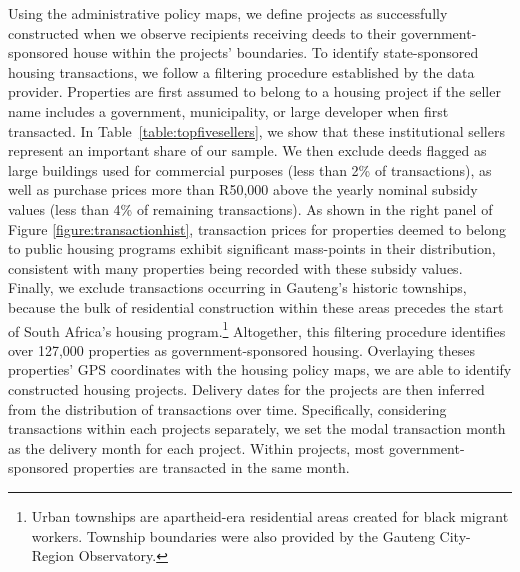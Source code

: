 \documentclass[12pt]{article}
\begin{document}
 Using the administrative policy maps, we define projects as successfully constructed when we observe recipients receiving deeds to their government-sponsored house within the projects' boundaries. To identify state-sponsored housing transactions, we follow a filtering procedure established by the data provider. Properties are first assumed to belong to a housing project if the seller name includes a government, municipality, or large developer when first transacted. In 	\mbox{Table \ref{table:topfivesellers}}, we show that these institutional sellers represent an important share of our sample. We then exclude deeds flagged as large buildings used for commercial purposes (less than 2\% of transactions), as well as purchase prices more than R50,000 above the yearly nominal subsidy values (less than 4\% of remaining transactions). As shown in the right panel of Figure \ref{figure:transactionhist}, transaction prices for properties deemed to belong to public housing programs exhibit significant mass-points in their distribution, consistent with many properties being recorded with these subsidy values. Finally, we exclude transactions occurring in Gauteng's historic townships, because the bulk of residential construction within these areas precedes the start of South Africa's housing program.\footnote{Urban townships are apartheid-era residential areas created for black migrant workers. Township boundaries were also provided by the Gauteng City-Region Observatory.} Altogether, this filtering procedure identifies over 127,000 properties as government-sponsored housing. Overlaying theses properties' GPS coordinates with the housing policy maps, we are able to identify constructed housing projects. Delivery dates for the projects are then inferred from the distribution of transactions over time. Specifically, considering transactions within each projects separately, we set the modal transaction month as the delivery month for each project. Within projects, most government-sponsored properties are transacted in the same month. %
\end{document}
